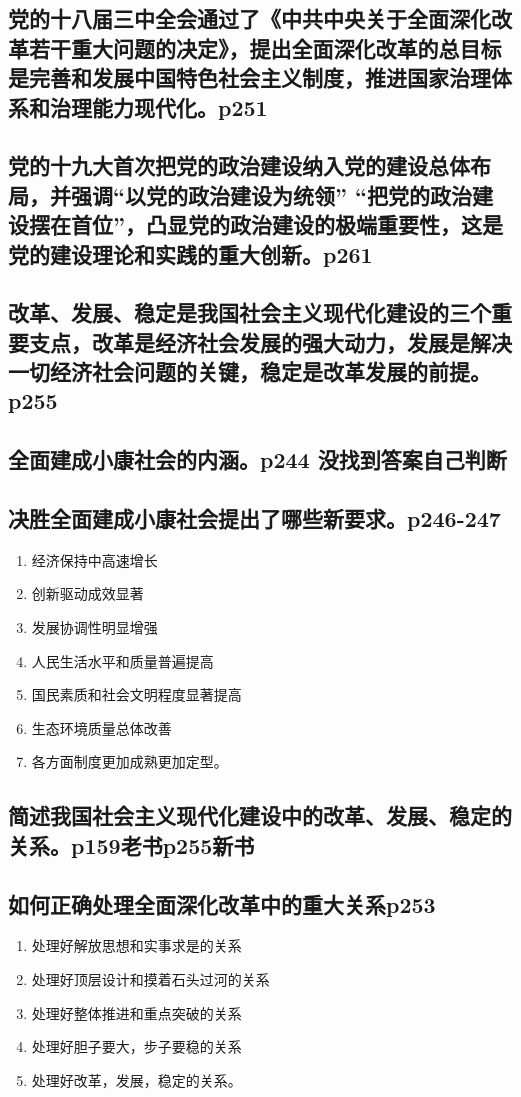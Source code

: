 \documentclass[UTF8]{ctexart}
\begin{document}
\subsection{党的十八届三中全会通过了《中共中央关于全面深化改革若干重大问题的决定》，提出全面深化改革的总目标是完善和发展中国特色社会主义制度，推进国家治理体系和治理能力现代化。p251}
\subsection{党的十九大首次把党的政治建设纳入党的建设总体布局，并强调“以党的政治建设为统领” “把党的政治建设摆在首位”，凸显党的政治建设的极端重要性，这是党的建设理论和实践的重大创新。p261}
\subsection{改革、发展、稳定是我国社会主义现代化建设的三个重要支点，改革是经济社会发展的强大动力，发展是解决一切经济社会问题的关键，稳定是改革发展的前提。p255}
\subsection{全面建成小康社会的内涵。p244 没找到答案自己判断}
\subsection{决胜全面建成小康社会提出了哪些新要求。p246-247}
\begin{enumerate}[(1)]
    \item 经济保持中高速增长
    \item 创新驱动成效显著
    \item 发展协调性明显增强
    \item 人民生活水平和质量普遍提高
    \item 国民素质和社会文明程度显著提高
    \item 生态环境质量总体改善
    \item 各方面制度更加成熟更加定型。
\end{enumerate}
\subsection{简述我国社会主义现代化建设中的改革、发展、稳定的关系。p159老书p255新书}
\newpage
\subsection{如何正确处理全面深化改革中的重大关系p253}
\begin{enumerate}[(1)]
    \item 处理好解放思想和实事求是的关系
    \item 处理好顶层设计和摸着石头过河的关系
    \item 处理好整体推进和重点突破的关系
    \item 处理好胆子要大，步子要稳的关系
    \item 处理好改革，发展，稳定的关系。 
\end{enumerate}
\end{document}
